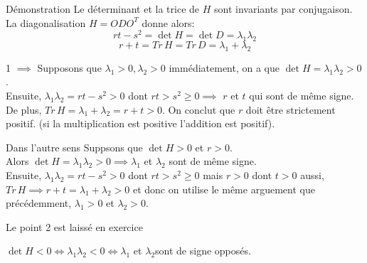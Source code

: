 \begin{parag}{Démonstration}
    Le déterminant et la trice de $H$ sont invariants par conjugaison. La diagonalisation $H = ODO^T$ donne alors:
    \begin{equation*} rt - s^2 = \det H = \det D = \lambda_1 \lambda_2 \end{equation*}
    \begin{equation*} r + t = Tr\,H = Tr\,D = \lambda_1 + \lambda_2 \end{equation*}
    \begin{subparag}{1 $\implies$}
        Supposons que $\lambda_1 > 0, \lambda_2 > 0$ immédiatement, on a que $\det H = \lambda_1\lambda_2 > 0$.\\
        Ensuite, $\lambda_1\lambda_2 = rt - s^2 > 0$ dont $rt > s^2 \geq 0 \implies$ $r$ et $t$ qui sont de même signe.\\
        De plus, $Tr\,H = \lambda_1 + \lambda_2 = r + t > 0$. On conclut que $r$ doit être strictement positif. (si la multiplication est positive  l'addition est positif).
    \end{subparag}
    \begin{subparag}{Dans l'autre sens}
        Suppsons que $\det H > 0$ et $r > 0$.\\
        Alors $\det H = \lambda_1\lambda_2 > 0 \implies \lambda_1$ et $\lambda_2$ sont de même signe.\\
        Ensuite, $\lambda_1 \lambda_2 = rt - s^2 > 0$ dont $rt > s^2 \geq 0$ mais $r > 0$ dont $t > 0$ aussi, $Tr\, H \implies r + t = \lambda_1 + \lambda_2 > 0$ et donc on utilise le même arguement que précédemment, $\lambda_1 > 0$ et $\lambda_2 > 0$.
    \end{subparag}
    \begin{subparag}{2}
        Le point 2 est laissé en exercice
        
    \end{subparag}
    \begin{subparag}{3}
        $\det H < 0 \iff \lambda_1\lambda_2 < 0 \iff \lambda_1$ et $\lambda_2$sont de signe opposés.
    \end{subparag}
    
\end{parag}

